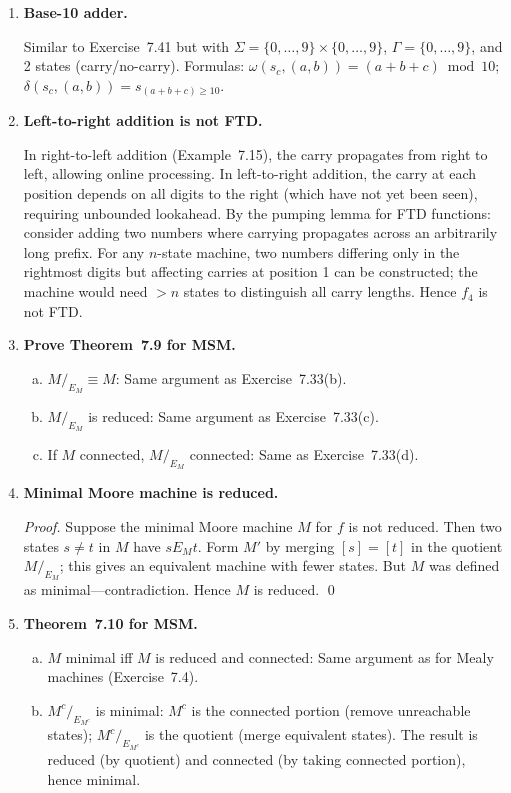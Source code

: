\begin{enumerate}[{7.}1.]
\item \textbf{Base-10 adder.}

Similar to Exercise~7.41 but with $\Sigma=\{0,\ldots,9\}\times\{0,\ldots,9\}$, $\Gamma=\{0,\ldots,9\}$, and 2 states (carry/no-carry).  Formulas: $\omega(s_c,(a,b))=(a+b+c)\bmod 10$; $\delta(s_c,(a,b))=s_{(a+b+c)\ge 10}$.

\item \textbf{Left-to-right addition is not FTD.}

In right-to-left addition (Example~7.15), the carry propagates from right to left, allowing online processing.  In left-to-right addition, the carry at each position depends on all digits to the right (which have not yet been seen), requiring unbounded lookahead.  By the pumping lemma for FTD functions: consider adding two numbers where carrying propagates across an arbitrarily long prefix.  For any $n$-state machine, two numbers differing only in the rightmost digits but affecting carries at position 1 can be constructed; the machine would need $>n$ states to distinguish all carry lengths.  Hence $f_4$ is not FTD.

\item \textbf{Prove Theorem~7.9 for MSM.}

\begin{enumerate}[(a)]
  \item $M/_{E_M}\equiv M$: Same argument as Exercise~7.33(b).
  \item $M/_{E_M}$ is reduced: Same argument as Exercise~7.33(c).
  \item If $M$ connected, $M/_{E_M}$ connected: Same as Exercise~7.33(d).
\end{enumerate}

\item \textbf{Minimal Moore machine is reduced.}

\begin{proof}
Suppose the minimal Moore machine $M$ for $f$ is not reduced.  Then two states $s\neq t$ in $M$ have $s E_M t$.  Form $M'$ by merging $[s]=[t]$ in the quotient $M/_{E_M}$; this gives an equivalent machine with fewer states.  But $M$ was defined as minimal---contradiction.  Hence $M$ is reduced. \qed
\end{proof}

\item \textbf{Theorem~7.10 for MSM.}

\begin{enumerate}[(a)]
  \item $M$ minimal iff $M$ is reduced and connected: Same argument as for Mealy machines (Exercise~7.4).
  \item $M^c/_{E_{M^c}}$ is minimal: $M^c$ is the connected portion (remove unreachable states); $M^c/_{E_{M^c}}$ is the quotient (merge equivalent states).  The result is reduced (by quotient) and connected (by taking connected portion), hence minimal.
\end{enumerate}


\end{enumerate}
